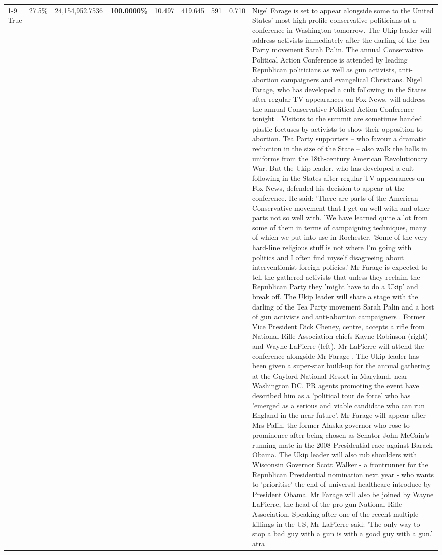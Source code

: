 \begin{table}[H]
\begin{tabular}{lllrlllll}
\cline{1-9}
True & 27.5\% & 24,154,952.7536 & \bfseries \color{red} 100.0000\% & 10.497 & 419.645 & 591 & 0.710 & Nigel Farage is set to appear alongside some to the United States' most high-profile conservative politicians at a conference in Washington tomorrow. The Ukip leader will address activists immediately after the darling of the Tea Party movement Sarah Palin. The annual Conservative Political Action Conference is attended by leading Republican politicians as well as gun activists, anti-abortion campaigners and evangelical Christians. Nigel Farage, who has developed a cult following in the States after regular TV appearances on Fox News, will address the annual Conservative Political Action Conference tonight . Visitors to the summit are sometimes handed plastic foetuses by activists to show their opposition to abortion. Tea Party supporters – who favour a dramatic reduction in the size of the State – also walk the halls in uniforms from the 18th-century American Revolutionary War. But the Ukip leader, who has developed a cult following in the States after regular TV appearances on Fox News, defended his decision to appear at the conference. He said: 'There are parts of the American Conservative movement that I get on well with and other parts not so well with. 'We have learned quite a lot from some of them in terms of campaigning techniques, many of which we put into use in Rochester. 'Some of the very hard-line religious stuff is not where I'm going with politics and I often find myself disagreeing about interventionist foreign policies.' Mr Farage is expected to tell the gathered activists that unless they reclaim the Republican Party they 'might have to do a Ukip' and break off. The Ukip leader will share a stage with the darling of the Tea Party movement Sarah Palin and a host of gun activists and anti-abortion campaigners . Former Vice President Dick Cheney, centre, accepts a rifle from National Rifle Association chiefs Kayne Robinson (right) and Wayne LaPierre (left). Mr LaPierre will attend the conference alongside Mr Farage . The Ukip leader has been given a super-star build-up for the annual gathering at the Gaylord National Resort in Maryland, near Washington DC. PR agents promoting the event have described him as a 'political tour de force' who has 'emerged as a serious and viable candidate who can run England in the near future'. Mr Farage will appear after Mrs Palin, the former Alaska governor who rose to prominence after being chosen as Senator John McCain's running mate in the 2008 Presidential race against Barack Obama. The Ukip leader will also rub shoulders with Wisconsin Governor Scott Walker - a frontrunner for the Republican Presidential nomination next year - who wants to 'prioritise' the end of universal healthcare introduce by President Obama. Mr Farage will also be joined by Wayne LaPierre, the head of the pro-gun National Rifle Association. Speaking after one of the recent multiple killings in the US, Mr LaPierre said: 'The only way to stop a bad guy with a gun is with a good guy with a gun.' atra \\

\end{tabular}
\end{table}
